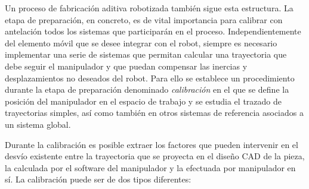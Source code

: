 Un proceso de fabricación aditiva robotizada también sigue esta estructura. La etapa de preparación, en concreto, es de vital importancia para calibrar con antelación todos los sistemas que participarán en el proceso. Independientemente del elemento móvil que se desee integrar con el robot, siempre es necesario implementar una serie de sistemas que permitan calcular una trayectoria que debe seguir el manipulador y que puedan compensar las inercias y desplazamientos no deseados del robot. Para ello se establece un procedimiento durante la etapa de preparación denominado \textit{calibración} en el que se define la posición del manipulador en el espacio de trabajo y se estudia el trazado de trayectorias simples, así como también en otros sistemas de referencia asociados a un sistema global.

Durante la calibración es posible extraer los factores que pueden intervenir en el desvío existente entre la trayectoria que se proyecta en el diseño \acrshort{CAD} de la pieza, la calculada por el software del manipulador y la efectuada por manipulador en sí. La calibración puede ser de dos tipos diferentes:

